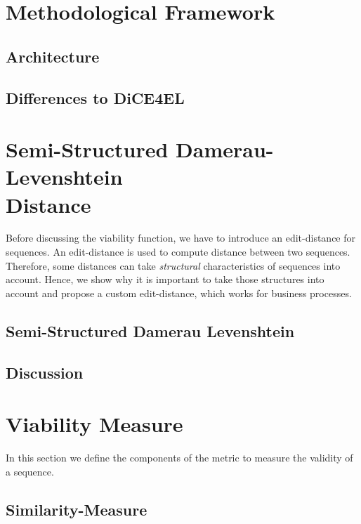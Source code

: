 \documentclass[12pt,a4paper]{report}
\begin{document}
\section{Methodological Framework}
\label{sec:framework}
\subsection{Architecture}


\subsection{Differences to DiCE4EL}


\section{Semi-Structured Damerau-Levenshtein \\ Distance}
\label{sec:ssdld}
Before discussing the viability function, we have to introduce an edit-distance for sequences. An edit-distance is used to compute distance between two sequences. Therefore, some distances can take \emph{structural} characteristics of sequences into account. Hence, we show why it is important to take those structures into account and propose a custom edit-distance, which works for business processes.


\subsection{Semi-Structured Damerau Levenshtein}

\subsection{Discussion}


\section{Viability Measure}
\label{sec:viability}
In this section we define the components of the metric to measure the validity of a sequence.

\subsection{Similarity-Measure}
\label{sec:similarity}

\end{document}
